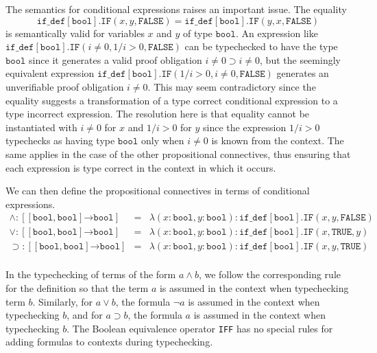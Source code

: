 \documentclass [12pt,twoside]{cslreport}
\newcommand{\aro}{\mathord\rightarrow} %
\newcommand{\funtype}[2]{[#1 \aro #2]}
\newcommand{\tupletype}[1]{[#1]}
\newcommand{\ttbool}{\mathtt{bool}}
\newcommand{\tttrue}{\mathtt{TRUE}}
\newcommand{\ttfalse}{\mathtt{FALSE}}
\newcommand{\ttif}{\mathtt{IF}}
\begin{document}
The semantics for conditional expressions raises an important issue.
The equality
$$\mathtt{if\_def}[\mathtt{bool}].\ttif(x, y, \ttfalse) =
\mathtt{if\_def}[\mathtt{bool}].\ttif(y, x, \ttfalse)$$
is semantically valid for variables $x$ and $y$ of type $\ttbool$\@.
An expression like $\mathtt{if\_def}[\ttbool].\ttif(i \neq 0, 1/i
> 0, \ttfalse)$ can be typechecked to have the type $\ttbool$ since
it generates a valid proof obligation $i\neq 0 \supset i\neq 0$, but
the seemingly equivalent expression
$\mathtt{if\_def}[\ttbool].\ttif( 1/i > 0,i \neq 0, \ttfalse)$
generates an unverifiable proof obligation $i\neq 0$\@.
This may seem contradictory since the equality suggests a transformation
of a type correct conditional expression to a type incorrect expression.  
The resolution here is that equality cannot be instantiated with
$i\neq 0$ for $x$ and $1/i > 0$ for $y$ since the expression
$1/i > 0$  typechecks as having type $\ttbool$ only when $i\neq 0$ is known
from the context.  The same applies in the case of the other
propositional connectives, thus ensuring that each expression is type
correct in the context in which it occurs.  

We can then define the propositional connectives in terms of  conditional
expressions. 
\begin{eqnarray*}
  \wedge : \funtype{\tupletype{\ttbool, \ttbool}}{\ttbool} & = & \lambda (x : \ttbool, y
: \ttbool) : \mathtt{if\_def[\ttbool].IF}(x, y, \ttfalse)\\
   \vee : \funtype{\tupletype{\ttbool, \ttbool}}{\ttbool} & = & \lambda (x : \ttbool, y
: \ttbool) : \mathtt{if\_def[\ttbool].IF}(x, \tttrue, y)\\
   \supset : \funtype{\tupletype{\ttbool, \ttbool}}{\ttbool} & = & \lambda (x : \ttbool, y
: \ttbool) : \mathtt{if\_def[\ttbool].IF}(x, y, \tttrue)\\
\end{eqnarray*}

In the typechecking of terms of the form $a \wedge b$,
we follow the corresponding rule for the definition so that 
the term $a$ is assumed in the context when typechecking term $b$\@.
Similarly, for $a\vee  b$, the formula $\neg a$ is assumed in
the context when typechecking $b$, and for $ a \supset b$,
the formula $ a$ is assumed in the context when typechecking $b$.
The Boolean equivalence operator {\tt IFF} has no special rules
for adding formulas to contexts during typechecking.   
\end{document}
